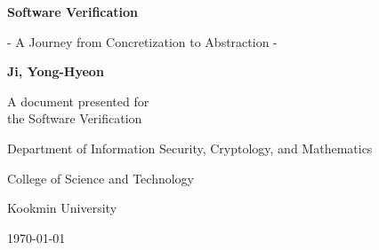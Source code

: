 \begin{titlepage}
    \centering
    
    \vspace*{1cm}
    
    \Huge\textsf{\textbf{Software Verification}}
    
    \vspace{0.5cm}
    \LARGE\textsf{- A Journey from Concretization to Abstraction -}
    
    \vspace{1.5cm}
    \textbf{Ji, Yong-Hyeon}

    \vfill
    A document presented for\\
    the Software Verification
    
    \vspace{0.8cm}
    {\large\textsf{Department of Information Security, Cryptology, and Mathematics}\par}
    {\large\textsf{College of Science and Technology}\par}
    {\large\textsf{Kookmin University}\par}
    \vspace{.25in}
    {\large \textsf{\today}\par}
    
\end{titlepage}

